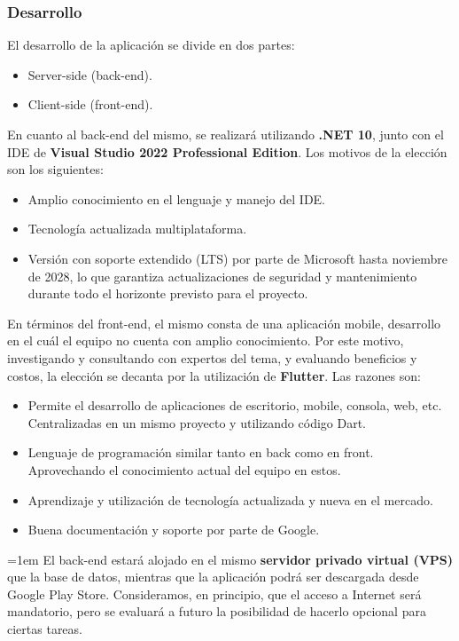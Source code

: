 \documentclass[a4paper,12pt]{article}
\begin{document}
    \subsubsection{Desarrollo}
    \par El desarrollo de la aplicación se divide en dos partes:
    \begin{itemize}
        \item Server-side (back-end).
        \item Client-side (front-end).
    \end{itemize}
    \par En cuanto al back-end del mismo, se realizará utilizando \textbf{.NET 10}, junto con el IDE de \textbf{Visual Studio 2022 Professional Edition}. Los motivos de la elección son los siguientes:
    \begin{itemize}
        \item Amplio conocimiento en el lenguaje y manejo del IDE.
        \item Tecnología actualizada multiplataforma.
        \item Versión con soporte extendido (LTS) por parte de Microsoft hasta noviembre de 2028, lo que garantiza actualizaciones de seguridad y mantenimiento durante todo el horizonte previsto para el proyecto.
    \end{itemize}
    \par En términos del front-end, el mismo consta de una aplicación mobile, desarrollo en el cuál el equipo no cuenta con amplio conocimiento. Por este motivo, investigando y consultando con expertos del tema, y evaluando beneficios y costos, la elección se decanta por la utilización de \textbf{Flutter}. Las razones son:
    \begin{itemize}
        \item Permite el desarrollo de aplicaciones de escritorio, mobile, consola, web, etc. Centralizadas en un mismo proyecto y utilizando código Dart.
        \item Lenguaje de programación similar tanto en back como en front. Aprovechando el conocimiento actual del equipo en estos.
        \item Aprendizaje y utilización de tecnología actualizada y nueva en el mercado.
        \item Buena documentación y soporte por parte de Google.
    \end{itemize}
    \par\begingroup\emergencystretch=1em
    El back-end estará alojado en el mismo \textbf{servidor privado virtual (VPS)} que la base de datos, mientras que la aplicación podrá ser descargada desde Google Play Store. Consideramos, en principio, que el acceso a Internet será mandatorio, pero se evaluará a futuro la posibilidad de hacerlo opcional para ciertas tareas.\par\endgroup
\end{document}
